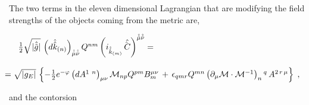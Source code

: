\documentclass[12pt,a4paper]{article}
\begin{document}
The two terms in the eleven dimensional Lagrangian that are modifying
the field strengths of the objects coming from the metric are,

\begin{equation}
\label{eq:yoquese}
\begin{array}{rcl}
\textstyle{\frac{1}{2}}
\sqrt{|\hat{\hat{g}}|}\, 
\left(d\hat{\hat{k}}_{(n)}\right)_{\hat{\hat{\mu}}\hat{\hat{\nu}}}
Q^{nm} \left(i_{\hat{\hat{k}}_{(m)}}\hat{\hat{C}\,}
\right)^{\hat{\hat{\mu}}\hat{\hat{\nu}}}= & & \\
& & \\
& & \hspace{-7cm}
=\sqrt{|g_{E}|}\, 
\left\{
-\textstyle{\frac{1}{2}} e^{-\varphi} \left( dA^{1\ n}\right)_{\mu\nu}
   \mathcal{M}_{np}Q^{pm}B_{m}^{\mu\nu}\,+\, 
\epsilon_{qmr}Q^{mn}\left(  
                           \partial_{\mu}\mathcal{M}\cdot \mathcal{M}^{-1}
                     \right)_{n}{}^{q}\, A^{2\,r\,\mu} 
\right\}\; ,\\
\end{array}
\end{equation} 


and the contorsion
\end{document}
